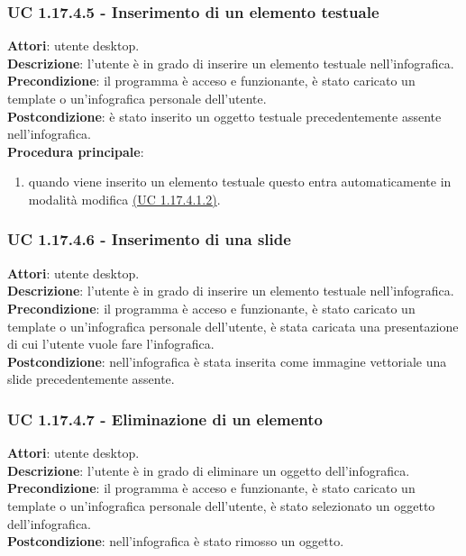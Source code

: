\subsubsection{UC 1.17.4.5 - Inserimento di un elemento testuale}{
	\label{uc1.17.4.5}
	\textbf{Attori}: utente desktop. \\
	\textbf{Descrizione}: l'utente è in grado di inserire un elemento testuale nell'infografica. \\
	\textbf{Precondizione}: il programma è acceso e funzionante, è stato caricato un template o un'infografica personale dell'utente.	\\
	\textbf{Postcondizione}: è stato inserito un oggetto testuale precedentemente assente nell'infografica.	\\
	\textbf{Procedura principale}:
	\begin{enumerate}
		\item quando viene inserito un elemento testuale questo entra automaticamente in modalità modifica \hyperref[uc1.17.4.1.2]{(UC 1.17.4.1.2)}.
	\end{enumerate}
	}
\subsubsection{UC 1.17.4.6 - Inserimento di una slide}{
	\label{uc1.17.4.6}
	\textbf{Attori}: utente desktop. \\
	\textbf{Descrizione}: l'utente è in grado di inserire un elemento testuale nell'infografica. \\
	\textbf{Precondizione}: il programma è acceso e funzionante, è stato caricato un template o un'infografica personale dell'utente, è stata caricata una presentazione di cui l'utente vuole fare l'infografica.	\\
	\textbf{Postcondizione}: nell'infografica è stata inserita come immagine vettoriale una slide precedentemente assente.	\\
	}
\subsubsection{UC 1.17.4.7 - Eliminazione di un elemento}{
	\label{uc1.17.4.7}
	\textbf{Attori}: utente desktop. \\
	\textbf{Descrizione}: l'utente è in grado di eliminare un oggetto dell'infografica. \\
	\textbf{Precondizione}: il programma è acceso e funzionante, è stato caricato un template o un'infografica personale dell'utente, è stato selezionato un oggetto dell'infografica.	\\
	\textbf{Postcondizione}: nell'infografica è stato rimosso un oggetto.	\\
	}
